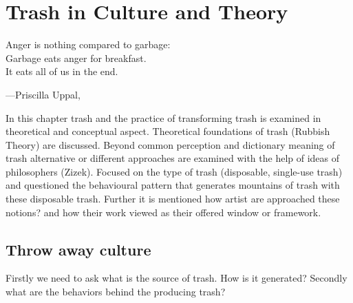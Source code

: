 \chapter{Trash in Culture and Theory}





\epigraph{Anger is nothing compared to garbage:\\ Garbage eats anger for breakfast.\\ It eats all of us in the end.}{\hfill---Priscilla Uppal, }





%
%
In this chapter trash and the practice of transforming trash is examined in theoretical and conceptual aspect. Theoretical foundations of trash (Rubbish Theory) are discussed. Beyond common perception and dictionary meaning of trash alternative or different approaches are examined with the help of ideas of philosophers (Zizek). Focused on the type of trash (disposable, single-use trash) and questioned the behavioural pattern that generates mountains of trash with these disposable trash. Further it is mentioned how artist are approached these notions? and how their work viewed as their offered window or framework.





%
%
\section{Throw away culture}
Firstly we need to ask what is the source of trash. How is it generated? Secondly what are the behaviors behind the producing trash?





%
%
   

